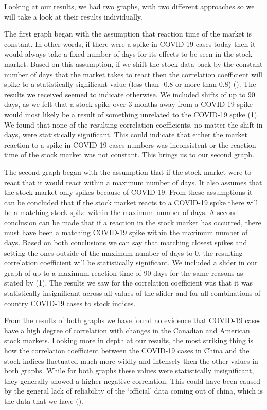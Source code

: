 \documentclass[fontsize=11pt]{article}
\begin{document}
Looking at our results, we had two graphs, with two different approaches so we will take a look at their results individually. 

The first graph began with the assumption that reaction time of the market is constant. 
In other words, if there were a spike in COVID-19 cases today then it would always take a fixed number of days for its effects to be seen in the stock market. 
Based on this assumption, if we shift the stock data back by the constant number of days that the market takes to react then the correlation coefficient will spike to a statistically significant value (less than -0.8 or more than 0.8) (\cite{investopedia}). 
The results we received seemed to indicate otherwise. 
We included shifts of up to 90 days, as we felt that a stock spike over 3 months away from a COVID-19 spike would most likely be a result of something unrelated to the COVID-19 spike (1).
We found that none of the resulting correlation coefficients, no matter the shift in days, were statistically significant. 
This could indicate that either the market reaction to a spike in COVID-19 cases numbers was inconsistent or the reaction time of the stock market was not constant. 
This brings us to our second graph.

The second graph began with the assumption that if the stock market were to react that it would react within a maximum number of days.
It also assumes that the stock market only spikes because of COVID-19. 
From these assumptions it can be concluded that if the stock market reacts to a COVID-19 spike there will be a matching stock spike within the maximum number of days. 
A second conclusion can be made that if a reaction in the stock market has occurred, there must have been a matching COVID-19 spike within the maximum number of days. 
Based on both conclusions we can say that matching closest spikes and setting the ones outside of the maximum number of days to 0, the resulting correlation coefficient will be statistically significant.
We included a slider in our graph of up to a maximum reaction time of 90 days for the same reasons as stated by (1).
The results we saw for the correlation coefficient was that it was  statistically insignificant across all values of the slider and for all combinations of country COVID-19 cases to stock indices. 

From the results of both graphs we have found no evidence that COVID-19 cases have a high degree of correlation with changes in the Canadian and American stock markets. 
Looking more in depth at our results, the most striking thing is how the correlation coefficient between the COVID-19 cases in China and the stock indices fluctuated much more wildly and intensely then the other values in both graphs. 
While for both graphs these values were statistically insignificant, they generally showed a higher negative correlation.
This could have been caused by the general lack of reliability of the `official' data coming out of china, which is the data that we have (\cite{time}).
\end{document}
